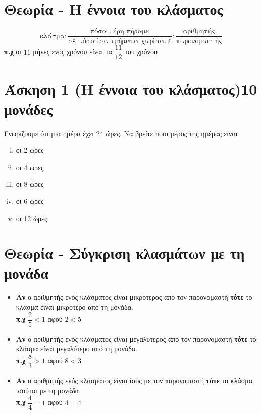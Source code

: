 \documentclass[a4paper,10pt]{report}
\begin{document}
\section*{Θεωρία - Η έννοια του κλάσματος\hfill \small{}}
$$ \text{κλάσμα}:\dfrac{\text{πόσα μέρη πήραμε}}{\text{σε πόσα ίσα τμήματα χωρίσαμε}}:\dfrac{\text{αριθμητής}}{\text{παρονομαστής}} $$
\textbf{π.χ} οι $11$ μήνες ενός χρόνου είναι τα $\dfrac{11}{12}$ του χρόνου

\section*{Άσκηση 1  (Η έννοια του κλάσματος)\hfill \small{10 μονάδες}}
Γνωρίζουμε ότι μια ημέρα έχει 24 ώρες. Να βρείτε ποιο μέρος της ημέρας είναι 
\begin{enumerate}[i)]
 \item οι 2 ώρες
 \item οι 4 ώρες
 \item οι 8 ώρες 
 \item οι 6 ώρες 
 \item οι 12 ώρες
\end{enumerate}

\section*{Θεωρία - Σύγκριση κλασμάτων με τη μονάδα \hfill \small{}}
\begin{itemize}
 \item \textbf{Αν} ο αριθμητής ενός κλάσματος είναι μικρότερος από τον παρονομαστή 
        \textbf{τότε} το κλάσμα είναι μικρότερο από τη μονάδα.\\
        \textbf{π.χ} $\dfrac{2}{5}<1$ αφού $2<5$
 \item \textbf{Αν} ο αριθμητής ενός κλάσματος είναι μεγαλύτερος από τον παρονομαστή 
        \textbf{τότε} το κλάσμα είναι μεγαλύτερο από τη μονάδα.\\
        \textbf{π.χ} $\dfrac{8}{3}>1$ αφού $8<3$
 \item \textbf{Αν} ο αριθμητής ενός κλάσματος είναι ίσος με τον παρονομαστή 
        \textbf{τότε} το κλάσμα ισούται με τη μονάδα.\\
        \textbf{π.χ} $\dfrac{4}{4}=1$ αφού $4=4$
\end{itemize}
\end{document}
